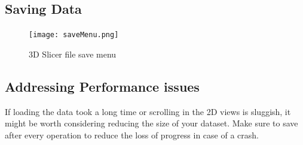 \subsection{Saving Data}
  \begin{figure}[h!]
	\centerline{
		\texttt{[image: saveMenu.png]}}
	\caption{3D Slicer file save menu}
	\label{fig:save}
\end{figure}

\pagebreak
\subsection{Addressing Performance issues}
If loading the data took a long time or scrolling in the 2D views is sluggish, %
it might be worth considering reducing the size of your dataset.
Make sure to save after every operation to reduce the loss of progress in case of a crash.
